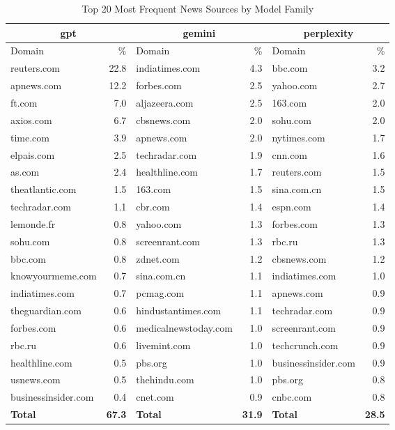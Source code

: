 \begin{table*}[htbp]
\centering
\caption{Top 20 Most Frequent News Sources by Model Family}
\label{tab:top_news_sources}
\begin{tabular}{lr|lr|lr}
\toprule
\multicolumn{2}{c|}{\textbf{gpt}} & \multicolumn{2}{c|}{\textbf{gemini}} & \multicolumn{2}{c}{\textbf{perplexity}} \\
\midrule
Domain & \% & Domain & \% & Domain & \% \\
\midrule
reuters.com & 22.8 & indiatimes.com & 4.3 & bbc.com & 3.2 \\
apnews.com & 12.2 & forbes.com & 2.5 & yahoo.com & 2.7 \\
ft.com & 7.0 & aljazeera.com & 2.5 & 163.com & 2.0 \\
axios.com & 6.7 & cbsnews.com & 2.0 & sohu.com & 2.0 \\
time.com & 3.9 & apnews.com & 2.0 & nytimes.com & 1.7 \\
elpais.com & 2.5 & techradar.com & 1.9 & cnn.com & 1.6 \\
as.com & 2.4 & healthline.com & 1.7 & reuters.com & 1.5 \\
theatlantic.com & 1.5 & 163.com & 1.5 & sina.com.cn & 1.5 \\
techradar.com & 1.1 & cbr.com & 1.4 & espn.com & 1.4 \\
lemonde.fr & 0.8 & yahoo.com & 1.3 & forbes.com & 1.3 \\
sohu.com & 0.8 & screenrant.com & 1.3 & rbc.ru & 1.3 \\
bbc.com & 0.8 & zdnet.com & 1.2 & cbsnews.com & 1.2 \\
knowyourmeme.com & 0.7 & sina.com.cn & 1.1 & indiatimes.com & 1.0 \\
indiatimes.com & 0.7 & pcmag.com & 1.1 & apnews.com & 0.9 \\
theguardian.com & 0.6 & hindustantimes.com & 1.1 & techradar.com & 0.9 \\
forbes.com & 0.6 & medicalnewstoday.com & 1.0 & screenrant.com & 0.9 \\
rbc.ru & 0.6 & livemint.com & 1.0 & techcrunch.com & 0.9 \\
healthline.com & 0.5 & pbs.org & 1.0 & businessinsider.com & 0.9 \\
usnews.com & 0.5 & thehindu.com & 1.0 & pbs.org & 0.8 \\
businessinsider.com & 0.4 & cnet.com & 0.9 & cnbc.com & 0.8 \\
\midrule
\textbf{Total} & \textbf{67.3} & \textbf{Total} & \textbf{31.9} & \textbf{Total} & \textbf{28.5} \\
\bottomrule
\end{tabular}
\end{table*}
